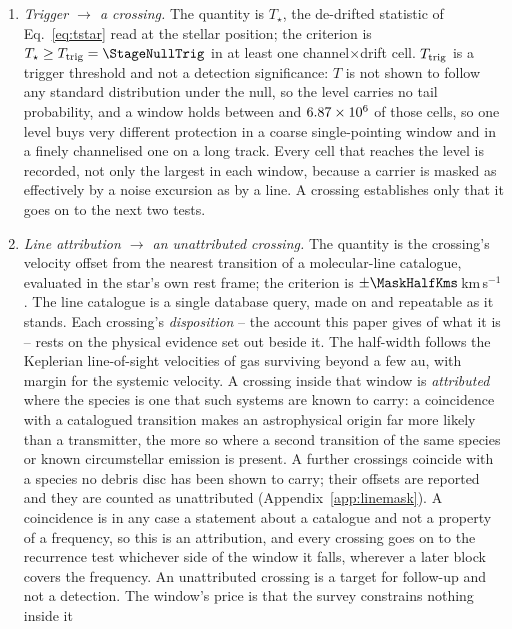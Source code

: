\begin{enumerate}[label=(\roman*),leftmargin=1.9em,itemsep=3pt,topsep=3pt,parsep=0pt]
\item \emph{Trigger $\to$ a crossing.} The quantity is $T_\star$, the
de-drifted statistic of Eq.~\ref{eq:tstar} read at the stellar position; the
criterion is $T_\star\geq T_{\rm trig}=\StageNullTrig$ in at least one
channel$\times$drift cell. $T_{\rm trig}$ is a trigger
threshold and not a detection significance: $T$ is not shown to follow any
standard distribution under the null, so the level carries no tail
probability, and a window holds between \TuCellsLo{} and $6.87 \times 10^{6}$ of
those cells, so one level buys very different protection in a coarse
single-pointing window and in a finely channelised one on a long track. Every
cell that reaches the level is recorded, not only the largest in each window,
because a carrier is masked as effectively by a noise excursion as by a line.
A crossing establishes only that it goes on to the next two tests.
\item \emph{Line attribution $\to$ an unattributed crossing.} The quantity
is the crossing's velocity offset from the nearest transition of a
molecular-line catalogue, evaluated in the star's own rest frame; the
criterion is $\pm\MaskHalfKms$\,km\,s$^{-1}$. The line catalogue is a
single database query, made on \MkListDate{} and repeatable as it stands.
Each crossing's \emph{disposition} -- the account this paper
gives of what it is -- rests on the physical evidence set out beside it.
The half-width follows the Keplerian line-of-sight
velocities of gas
surviving beyond a few au, with margin for the systemic velocity. A crossing
inside that window is \emph{attributed} where the species is one that such
systems are known to carry: a coincidence with a catalogued transition makes
an astrophysical origin far more likely than a transmitter, the more so
where a second transition of the same species or known circumstellar
emission is present. A further \MkNSODecideWord{} crossings coincide with a
species no debris disc has been shown to carry; their offsets are reported
and they are counted as unattributed (Appendix~\ref{app:linemask}).
A coincidence is in any case a statement about a catalogue and not a
property of a frequency, so this is an attribution, and
every crossing goes on to the recurrence test whichever side of the
window it falls, wherever a later block covers the frequency. An
unattributed crossing is a target for follow-up and not a detection. The
window's price is that the survey constrains nothing inside it

\end{enumerate}
